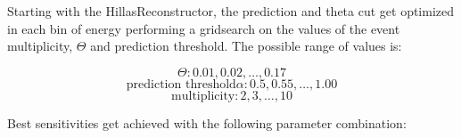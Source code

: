 Starting with the HillasReconstructor, the prediction
and theta cut get optimized in each bin of energy performing a gridsearch on the 
values of the event multiplicity, $\Theta$ and prediction threshold.
The possible range of values is:

$$ \Theta: 0.01, 0.02, \ldots, 0.17 $$
$$ \text{prediction threshold} \alpha: 0.5, 0.55, \ldots, 1.00 $$
$$ \text{multiplicity}: 2, 3, \ldots, 10 $$

Best sensitivities get achieved with the following parameter combination:

